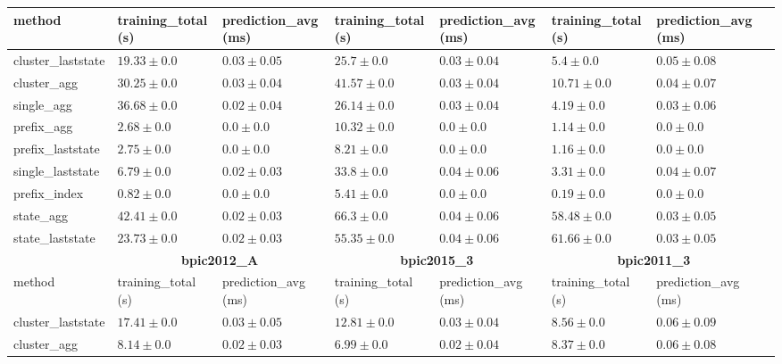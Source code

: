\documentclass[twoside,11pt]{Latex/Classes/PhDthesisPSnPDF}
\begin{document}
\begin{table}[!htbp]
{\begin{tabular}{llllllll}
					method  & training\_total (s) & prediction\_avg (ms) & training\_total (s) & prediction\_avg (ms) & training\_total (s) & prediction\_avg (ms) \\ \midrule
					cluster\_laststate & $19.33 \pm 0.0$ & $0.03 \pm 0.05$ & $25.7 \pm 0.0$ & $0.03 \pm 0.04$ & $5.4 \pm 0.0$ & $0.05 \pm 0.08$ \\ 
					cluster\_agg & $30.25 \pm 0.0$ & $0.03 \pm 0.04$ & $41.57 \pm 0.0$ & $0.03 \pm 0.04$ & $10.71 \pm 0.0$ & $0.04 \pm 0.07$ \\ 
					single\_agg & $36.68 \pm 0.0$ & $0.02 \pm 0.04$ & $26.14 \pm 0.0$ & $0.03 \pm 0.04$ & $4.19 \pm 0.0$ & $0.03 \pm 0.06$ \\ 
					prefix\_agg & $2.68 \pm 0.0$ & $\mathbf{0.0 \pm 0.0}$ & $10.32 \pm 0.0$ & $\mathbf{0.0 \pm 0.0}$ & $1.14 \pm 0.0$ & $\mathbf{0.0 \pm 0.0}$ \\ 
					prefix\_laststate & $2.75 \pm 0.0$ & $\mathbf{0.0 \pm 0.0}$ & $8.21 \pm 0.0$ & $\mathbf{0.0 \pm 0.0}$ & $1.16 \pm 0.0$ & $\mathbf{0.0 \pm 0.0}$ \\ 
					single\_laststate & $6.79 \pm 0.0$ & $0.02 \pm 0.03$ & $33.8 \pm 0.0$ & $0.04 \pm 0.06$ & $3.31 \pm 0.0$ & $0.04 \pm 0.07$ \\ 
					prefix\_index & $\mathbf{0.82 \pm 0.0}$ & $\mathbf{0.0 \pm 0.0}$ & $\mathbf{5.41 \pm 0.0}$ & $\mathbf{0.0 \pm 0.0}$ & $\mathbf{0.19 \pm 0.0}$ & $\mathbf{0.0 \pm 0.0}$ \\ 
					state\_agg & $42.41 \pm 0.0$ & $0.02 \pm 0.03$ & $66.3 \pm 0.0$ & $0.04 \pm 0.06$ & $58.48 \pm 0.0$ & $0.03 \pm 0.05$ \\ 
					state\_laststate & $23.73 \pm 0.0$ & $0.02 \pm 0.03$ & $55.35 \pm 0.0$ & $0.04 \pm 0.06$ & $61.66 \pm 0.0$ & $0.03 \pm 0.05$ \\ 
					\bottomrule
					\toprule
					& \multicolumn{2}{c}{{\bfseries bpic2012\_A}} & \multicolumn{2}{c}{{\bfseries bpic2015\_3}} & \multicolumn{2}{c}{{\bfseries bpic2011\_3}} \\ \cmidrule(lr){2-3} \cmidrule(lr){4-5} \cmidrule(lr){6-7}
					method  & training\_total (s) & prediction\_avg (ms) & training\_total (s) & prediction\_avg (ms) & training\_total (s) & prediction\_avg (ms) \\ \midrule
					cluster\_laststate & $17.41 \pm 0.0$ & $0.03 \pm 0.05$ & $12.81 \pm 0.0$ & $0.03 \pm 0.04$ & $8.56 \pm 0.0$ & $0.06 \pm 0.09$ \\ 
					cluster\_agg & $8.14 \pm 0.0$ & $0.02 \pm 0.03$ & $6.99 \pm 0.0$ & $0.02 \pm 0.04$ & $8.37 \pm 0.0$ & $0.06 \pm 0.08$ \\ 

\end{tabular}}
\end{table}
\end{document}
